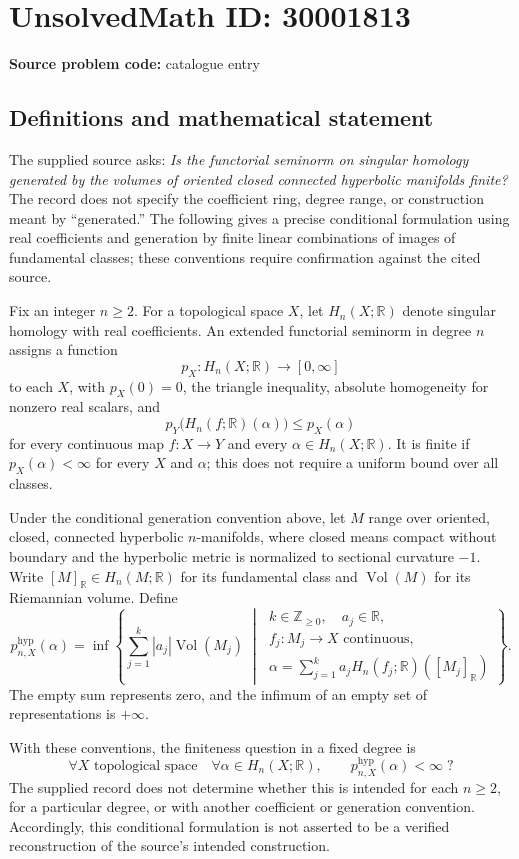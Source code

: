 \documentclass[11pt]{article}
\newcommand{\Z}{\mathbb{Z}}
\newcommand{\R}{\mathbb{R}}
\begin{document}
\section*{UnsolvedMath ID: 30001813}
\textbf{Source problem code:} catalogue entry
\subsection{Definitions and mathematical statement}
The supplied source asks: \emph{Is the functorial seminorm on singular homology generated by the volumes of oriented closed connected hyperbolic manifolds finite?} The record does not specify the coefficient ring, degree range, or construction meant by ``generated.'' The following gives a precise conditional formulation using real coefficients and generation by finite linear combinations of images of fundamental classes; these conventions require confirmation against the cited source.

Fix an integer \(n\geq 2\). For a topological space \(X\), let \(H_n(X;\R)\) denote singular homology with real coefficients. An extended functorial seminorm in degree \(n\) assigns a function
\[
 p_X:H_n(X;\R)\longrightarrow[0,\infty]
\]
to each \(X\), with \(p_X(0)=0\), the triangle inequality, absolute homogeneity for nonzero real scalars, and
\[
 p_Y\bigl(H_n(f;\R)(\alpha)\bigr)\leq p_X(\alpha)
\]
for every continuous map \(f:X\to Y\) and every \(\alpha\in H_n(X;\R)\). It is finite if \(p_X(\alpha)<\infty\) for every \(X\) and \(\alpha\); this does not require a uniform bound over all classes.

Under the conditional generation convention above, let \(M\) range over oriented, closed, connected hyperbolic \(n\)-manifolds, where closed means compact without boundary and the hyperbolic metric is normalized to sectional curvature \(-1\). Write \([M]_{\R}\in H_n(M;\R)\) for its fundamental class and \(\operatorname{Vol}(M)\) for its Riemannian volume. Define
\[
 p^{\mathrm{hyp}}_{n,X}(\alpha)=
 \inf\left\{
 \sum_{j=1}^{k}|a_j|\operatorname{Vol}(M_j)
 \;\middle|\;
 \begin{gathered}
 k\in\Z_{\geq0},\quad a_j\in\R,\\
 f_j:M_j\to X\text{ continuous},\\
 \alpha=\sum_{j=1}^{k}a_jH_n(f_j;\R)([M_j]_{\R})
 \end{gathered}
 \right\}.
\]
The empty sum represents zero, and the infimum of an empty set of representations is \(+\infty\).

With these conventions, the finiteness question in a fixed degree is
\[
 \forall X\text{ topological space}\quad
 \forall\alpha\in H_n(X;\R),\qquad
 p^{\mathrm{hyp}}_{n,X}(\alpha)<\infty\;?
\]
The supplied record does not determine whether this is intended for each \(n\geq2\), for a particular degree, or with another coefficient or generation convention. Accordingly, this conditional formulation is not asserted to be a verified reconstruction of the source's intended construction.
\end{document}
